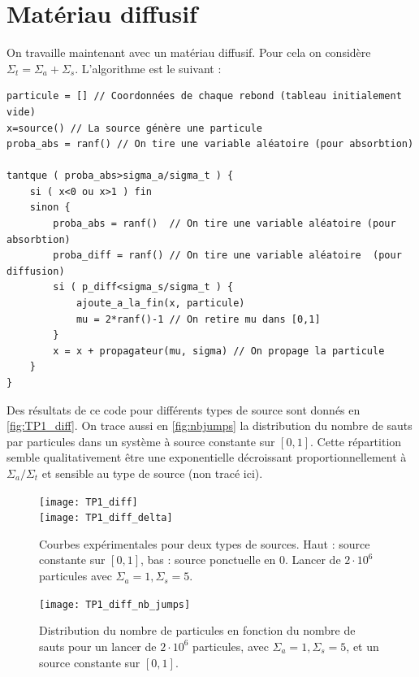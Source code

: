 \documentclass[11pt,a4paper]{article}
\begin{document}
\section{Matériau diffusif}

On travaille maintenant avec un matériau diffusif. Pour cela on considère $\Sigma_t = \Sigma_a + \Sigma_s$. L'algorithme est le suivant : 

\begin{verbatim}
particule = [] // Coordonnées de chaque rebond (tableau initialement vide) 
x=source() // La source génère une particule                                      
proba_abs = ranf() // On tire une variable aléatoire (pour absorbtion)

tantque ( proba_abs>sigma_a/sigma_t ) {
    si ( x<0 ou x>1 ) fin 
    sinon {
        proba_abs = ranf()  // On tire une variable aléatoire (pour absorbtion)
        proba_diff = ranf() // On tire une variable aléatoire  (pour diffusion)
        si ( p_diff<sigma_s/sigma_t ) {
            ajoute_a_la_fin(x, particule)
            mu = 2*ranf()-1 // On retire mu dans [0,1]
        }
        x = x + propagateur(mu, sigma) // On propage la particule
    }
}
\end{verbatim}

Des résultats de ce code pour différents types de source sont donnés en \autoref{fig:TP1_diff}. On trace aussi en \autoref{fig:nbjumps} la distribution du nombre de sauts par particules dans un système à source constante sur $[0,1]$. Cette répartition semble qualitativement être une exponentielle décroissant proportionnellement à $\Sigma_a/\Sigma_t$ et sensible au type de source (non tracé ici).
\begin{figure}
  \centering
  \texttt{[image: TP1\_diff]} \\
  \texttt{[image: TP1\_diff\_delta]}
  \caption{Courbes expérimentales pour deux types de sources. Haut : source constante sur $[0,1]$, bas : source ponctuelle en 0. Lancer de $2\cdot10^6$ particules avec $\Sigma_a = 1, \Sigma_s = 5$.}
  \label{fig:TP1_diff}
\end{figure}

\begin{figure}
  \centering
  \texttt{[image: TP1\_diff\_nb\_jumps]}
  \caption{Distribution du nombre de particules en fonction du nombre de sauts pour un lancer de $2\cdot10^6$ particules, avec $\Sigma_a = 1, \Sigma_s = 5$, et un source constante sur $[0,1]$.}
  \label{fig:nbjumps}
\end{figure}
\end{document}
